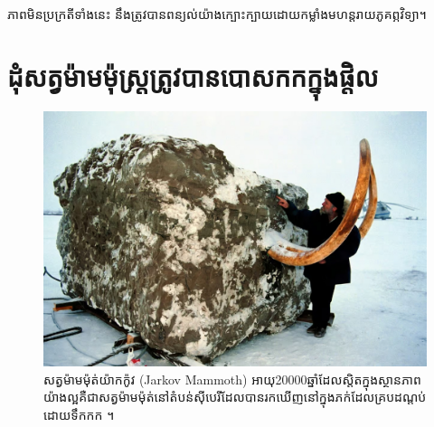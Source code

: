 \documentclass[10pt,twocolumn,letterpaper]{article}
\begin{document}
ភាពមិនប្រក្រតីទាំងនេះ នឹងត្រូវបានពន្យល់យ៉ាងក្បោះក្បាយដោយកម្លាំងមហន្តរាយភូគព្ភវិទ្យា។

\section{ដុំសត្វម៉ាមម៉ុស្ដ្រត្រូវបានបោសកកក្នុងផ្តិល}
\begin{figure}[t]
\begin{center}
   \includegraphics[width=1\linewidth]{jarkov-mammoth.jpg}
\end{center}
   \caption{សត្វម៉ាមម៉ុត់យ៉ាកក៉ូវ (Jarkov Mammoth) អាយុ20000ឆ្នាំដែលស្តិតក្នុងស្ថានភាពយ៉ាងល្អគឺជាសត្វម៉ាមម៉ុត់នៅតំបន់ស៊ីបេរីដែលបានរកឃើញនៅក្នុងភក់ដែលគ្របដណ្តប់ដោយទឹកកក \cite{51}។}
\label{fig:1}
\label{fig:onecol}
\end{figure}
\end{document}

